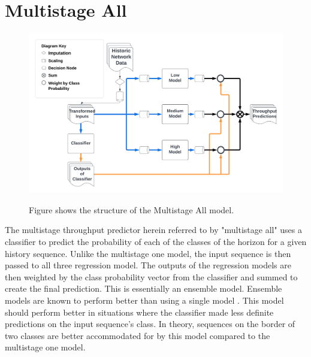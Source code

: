 \section{Multistage All}
\begin{figure}[h]
\centering
\includegraphics[scale=0.15]{Multistage All.png}
\label{fig:multistage_one}
\caption{Figure shows the structure of the Multistage All model.}
\end{figure}

The multistage throughput predictor herein referred to by "multistage all" uses a classifier to predict the probability of each of the classes of the horizon for a given history sequence. Unlike the multistage one model, the input sequence is then passed to all three regression model. The outputs of the regression models are then weighted by the class probability vector from the classifier and summed to create the final prediction. This is essentially an ensemble model. Ensemble models are known to perform better than using a single model \cite{https://doi.org/10.1002/widm.1249}. This model should perform better in situations where the classifier made less definite predictions on the input sequence's class. In theory, sequences on the border of two classes are better accommodated for by this model compared to the multistage one model.
